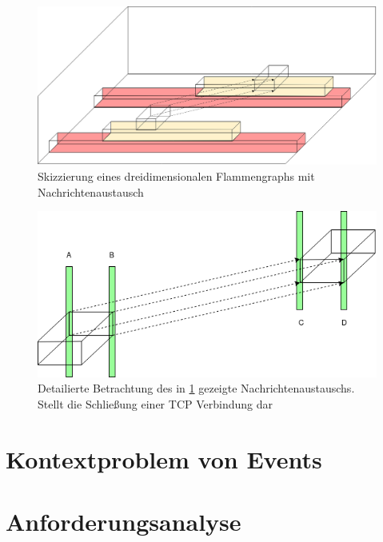  

\begin{figure}[!ht]
	\centering
	\includegraphics[scale=0.3]{img/Problembeschreibung/flamegraph_3D.png}
	\caption[3D Flammengraph]{Skizzierung eines dreidimensionalen Flammengraphs mit Nachrichtenaustausch}
	\label{fig:flamegraph_3D}
\end{figure}

\begin{figure}[!ht]
	\centering
	\includegraphics[scale=0.5]{img/Problembeschreibung/flamegraph_3D_closing.png}
	\caption[Flammengraph TCP schließung]{Detailierte Betrachtung des in \cref{fig:flamegraph_3D} gezeigte Nachrichtenaustauschs. Stellt die Schließung einer TCP Verbindung dar}
	\label{fig:flamegraph_3D_closing}
\end{figure}

\section{Kontextproblem von Events}
\label{section: Kontextproblem von Events}

\section{Anforderungsanalyse}
\label{section:Anforderungsanalyse}

